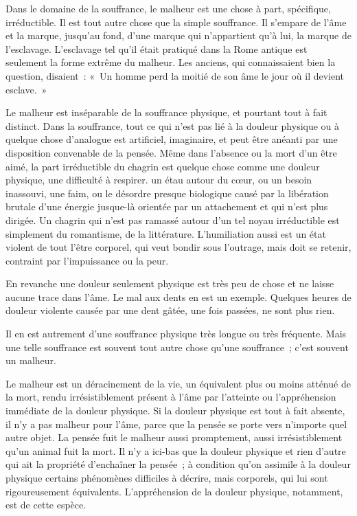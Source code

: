 \documentclass[french,twoside]{book} %
\newcommand\chaptercont{} %
\begin{document}
\chaptercont
\noindent Dans le domaine de la souffrance, le malheur est une chose à part, spécifique, irréductible. Il est tout autre chose que la simple souffrance. Il s'empare de l'âme et la marque, jusqu'au fond, d'une marque qui n'appartient qu'à lui, la marque de l'esclavage. L'esclavage tel qu'il était pratiqué dans la Rome antique est seulement la forme extrême du malheur. Les anciens, qui connaissaient bien la question, disaient : « Un homme perd la moitié de son âme le jour où il devient esclave. »\par
Le malheur est inséparable de la souffrance physique, et pourtant tout à fait distinct. Dans la souffrance, tout ce qui n'est pas lié à la douleur physique ou à quelque chose d'analogue est artificiel, imaginaire, et peut être anéanti par une disposition convenable de la pensée. Même dans l'absence ou la mort d'un être aimé, la part irréductible du chagrin est quelque chose comme une douleur physique, une difficulté à respirer. un étau autour du cœur, ou un besoin inassouvi, une faim, ou le désordre presque biologique causé par la libération brutale d'une énergie jusque-là orientée par un attachement et qui n'est plus dirigée. Un chagrin qui n'est pas ramassé autour d'un tel noyau irréductible est simplement du romantisme, de la littérature. L'humiliation aussi est un état violent de tout l'être corporel, qui veut bondir sous l'outrage, mais doit se retenir, contraint par l'impuissance ou la peur.\par
En revanche une douleur seulement physique est très peu de chose et ne laisse aucune trace dans l'âme. Le mal aux dents en est un exemple. Quelques heures de douleur violente causée par une dent gâtée, une fois passées, ne sont plus rien.\par
Il en est autrement d'une souffrance physique très longue ou très fréquente. Mais une telle souffrance est souvent tout autre chose qu'une souffrance ; c'est souvent un malheur.\par
Le malheur est un déracinement de la vie, un équivalent plus ou moins atténué de la mort, rendu irrésistiblement présent à l'âme par l'atteinte ou l'appréhension immédiate de la douleur physique. Si la douleur physique est tout à fait absente, il n'y a pas malheur pour l'âme, parce que la pensée se porte vers n'importe quel autre objet. La pensée fuit le malheur aussi promptement, aussi irrésistiblement qu'un animal fuit la mort. Il n'y a ici-bas que la douleur physique et rien d'autre qui ait la propriété d'enchaîner la pensée ; à condition qu'on assimile à la douleur physique certains phénomènes difficiles à décrire, mais corporels, qui lui sont rigoureusement équivalents. L'appréhension de la douleur physique, notamment, est de cette espèce.\par
\end{document}
